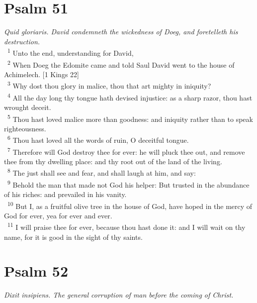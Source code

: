 \documentclass[a5paper,12pt]{article}
\begin{document}
\begin{multicols*}{2}
\section{Psalm 51}
\label{sec:org18a107f}
\emph{Quid gloriaris. David condemneth the wickedness of Doeg, and foretelleth his destruction.}\\

~\textsuperscript{1} Unto the end, understanding for David,\\
~\textsuperscript{2} When Doeg the Edomite came and told Saul David went to the house of Achimelech. [1 Kings 22]\\
~\textsuperscript{3} Why dost thou glory in malice, thou that art mighty in iniquity?\\
~\textsuperscript{4} All the day long thy tongue hath devised injustice: as a sharp razor, thou hast wrought deceit.\\
~\textsuperscript{5} Thou hast loved malice more than goodness: and iniquity rather than to speak righteousness.\\
~\textsuperscript{6} Thou hast loved all the words of ruin, O deceitful tongue.\\
~\textsuperscript{7} Therefore will God destroy thee for ever: he will pluck thee out, and remove thee from thy dwelling place: and thy root out of the land of the living.\\
~\textsuperscript{8} The just shall see and fear, and shall laugh at him, and say:\\
~\textsuperscript{9} Behold the man that made not God his helper: But trusted in the abundance of his riches: and prevailed in his vanity.\\
~\textsuperscript{10} But I, as a fruitful olive tree in the house of God, have hoped in the mercy of God for ever, yea for ever and ever.\\
~\textsuperscript{11} I will praise thee for ever, because thou hast done it: and I will wait on thy name, for it is good in the sight of thy saints.\\

\section{Psalm 52}
\label{sec:org754d661}
\emph{Dixit insipiens. The general corruption of man before the coming of Christ.}\\


\end{multicols*}
\end{document}

